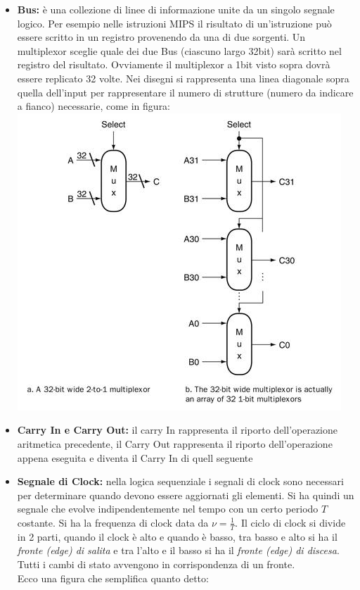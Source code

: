 \documentclass[a4paper,12pt, oneside]{book}
\begin{document}
\begin{itemize}
\item \textbf{Bus:} è una collezione di linee di informazione unite da un singolo segnale logico. Per esempio nelle istruzioni MIPS il risultato di un'istruzione può essere scritto in un registro provenendo da una di due sorgenti. Un multiplexor sceglie quale dei due Bus (ciascuno largo 32bit) sarà scritto nel registro del risultato. Ovviamente il multiplexor a 1bit visto sopra dovrà essere replicato 32 volte. Nei disegni si rappresenta una linea diagonale sopra quella dell'input per rappresentare il numero di strutture (numero da indicare a fianco) necessarie, come in figura:\\
\includegraphics[scale=0.58]{img/mult2.png}\\
\item \textbf{Carry In e Carry Out:} il carry In rappresenta il riporto dell'operazione aritmetica precedente, il Carry Out rappresenta il riporto dell'operazione appena eseguita e diventa il Carry In di quell seguente
\item \textbf{Segnale di Clock:} nella logica sequenziale i segnali di clock sono necessari per determinare quando devono essere aggiornati gli elementi. Si ha quindi un segnale che evolve indipendentemente nel tempo con un certo periodo $T$ costante. Si ha la frequenza di clock data da $\nu=\frac{1}{T}$. Il ciclo di clock si divide in 2 parti, quando il clock è alto e quando è basso, tra basso e alto si ha il \textit{fronte (edge) di salita} e tra l'alto e il basso si ha il \textit{fronte (edge) di discesa}. Tutti i cambi di stato avvengono in corrispondenza di un fronte. \\Ecco una figura che semplifica quanto detto:\\

\end{itemize}
\end{document}
